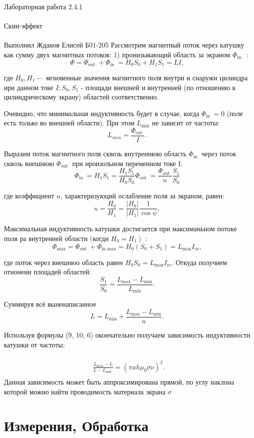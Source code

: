 \documentclass{astroedu-lab}
\begin{document}
\begin{problem}{\huge Лабораторная работа 2.4.1\\\\Скин-эффект\\\\Выполнил Жданов Елисей Б01-205}
Рассмотрим магнитный поток через катушку как сумму двух магнитных потоков: 1) пронизывающий область за экраном $\Phi_{\text {in: }}$ :
$$
\Phi=\Phi_{\text {out }}+\Phi_{\text {in }}=H_0 S_0+H_1 S_1=L I,
$$

где $H_0, H_1-$ мгновенные значения магнитного поля внутри и снаружи цилиндра ири данном токе $I ; S_0, S_1$ - площади внешней и внутренней (по отношению к цилиндрическому экрану) областей соответственно.

Очевидно, что минимальная индуктивность будет в случае, когда $\Phi_{\text {in }}=0$ (поле есть только во внешней области). При этом $L_{\min }$ не зависит от частоты:
$$
L_{m i n}=\frac{\Phi_{\text {out }}}{I} .
$$

Выразим поток магнитного поля сквозь внутреннюю область $\Phi_{\text {in }}$ через поток сквозь внешнюю $\Phi_{\text {out }}$ при ироизольном переменном токе I:
$$
\Phi_{\text {in }}=H_1 S_1=\frac{H_1 S_1}{H_0 S_0} \Phi_{\text {out }}=\frac{\Phi_{\text {out }}}{n} \frac{S_1}{S_0}
$$

где коэффициент $n$, характеризуюций ослабление поля за экраном, равен:
$$
n=\frac{H_0}{H_1}=\frac{\left|H_0\right|}{\left|H_1\right|} \frac{1}{\cos \psi},
$$

Максимальная индуктивность катушки достигается при максиманьном потоке поля ра внутренней области (когди $\left.H_0=H_1\right)$ :
$$
\Phi_{\max }=\Phi_{\text {out }}+\Phi_{\text {in } \max }=H_0\left(S_0+S_1\right)=L_{\max } I_m,
$$

где поток через внешнюо область равен $H_0 S_0=L_{\operatorname{man}} I_m$. Откуда получнем отнонени плоцадей областей:
$$
\frac{S_1}{S_0}=\frac{L_{\max }-L_{\min }}{L_{\min }} .
$$

Суммируя всё выненаписанное
$$
L=L_{\min }+\frac{L_{\max }-L_{\min }}{n} .
$$

Используя формулы (9, 10, 6) окончательно получаем зависимость индуктивности катушки от частоты:

$$
\begin{aligned}
&  \\
& \frac{L_{\max }-L}{L-L_{\text {min }}}=\left(\pi a h \mu_0 \sigma \nu\right)^2 \text {. } \\
& 
\end{aligned}
$$
Данная зависимость может быть аппроксимирована прямой, по углу наклона которой можно найти проводимость материала экрана $\sigma$

\section{Измерения, Обработка}


\end{problem}
\end{document}
